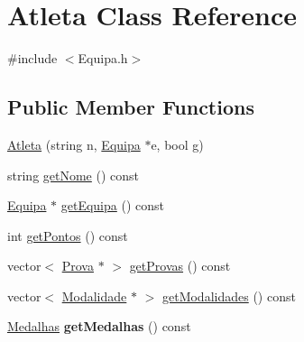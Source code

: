 \hypertarget{class_atleta}{}\section{Atleta Class Reference}
\label{class_atleta}


{\ttfamily \#include $<$Equipa.\+h$>$}

\subsection*{Public Member Functions}
\begin{DoxyCompactItemize}
\item 
\hyperlink{class_atleta_a055b02bad1b7615536e583e1f3708ec3}{Atleta} (string n, \hyperlink{class_equipa}{Equipa} $\ast$e, bool g)
\item 
string \hyperlink{class_atleta_a0f5be5cd0b18f224a7a5281216fc1bfd}{get\+Nome} () const 
\item 
\hyperlink{class_equipa}{Equipa} $\ast$ \hyperlink{class_atleta_a5abede47b955764c546dcd78683d4c1e}{get\+Equipa} () const 
\item 
int \hyperlink{class_atleta_ad10e9d537836304fbe44ce3e23533e2d}{get\+Pontos} () const 
\item 
vector$<$ \hyperlink{class_prova}{Prova} $\ast$ $>$ \hyperlink{class_atleta_a4d87755e5d458d4a2c5d53015669ad21}{get\+Provas} () const 
\item 
vector$<$ \hyperlink{class_modalidade}{Modalidade} $\ast$ $>$ \hyperlink{class_atleta_a4e4a08618d388c914705e4552bee3f00}{get\+Modalidades} () const 
\item 
\hypertarget{class_atleta_a8ee22416142160c743e683d3ab2d70c6}{}\hyperlink{struct_medalhas}{Medalhas} {\bfseries get\+Medalhas} () const \label{class_atleta_a8ee22416142160c743e683d3ab2d70c6}


\end{DoxyCompactItemize}
